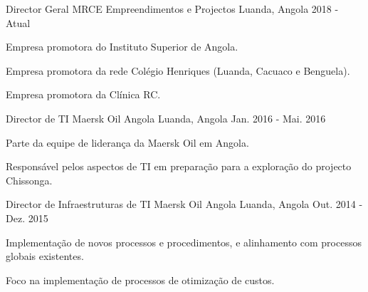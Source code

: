 \begin{cventries}

\cventry
{Director Geral} %
{MRCE Empreendimentos e Projectos} %
{Luanda, Angola} %
{2018 - Atual} %
{ %
\begin{cvitems}
    \item {Empresa promotora do Instituto Superior de Angola.}
    \item {Empresa promotora da rede Colégio Henriques (Luanda, Cacuaco e Benguela).}
    \item {Empresa promotora da Clínica RC.}
\end{cvitems}
}


\cventry
{Director de TI} %
{Maersk Oil Angola} %
{Luanda, Angola} %
{Jan. 2016 - Mai. 2016} %
{ %
\begin{cvitems}
\item {Parte da equipe de liderança da Maersk Oil em Angola.}
\item {Responsável pelos aspectos de TI em preparação para a exploração do projecto Chissonga.}
\end{cvitems}
}


\cventry
{Director de Infraestruturas de TI} %
{Maersk Oil Angola} %
{Luanda, Angola} %
{Out. 2014 - Dez. 2015} %
{ %
\begin{cvitems}
\item {Implementação de novos processos e procedimentos, e alinhamento com processos globais existentes.}
\item {Foco na implementação de processos de otimização de custos.}
\end{cvitems}
}



\end{cventries}
